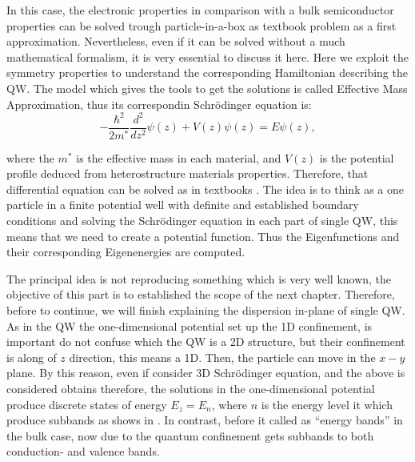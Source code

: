 In this case, the electronic properties in comparison with a bulk semiconductor properties can be solved trough particle-in-a-box as textbook problem as a first approximation. Nevertheless, even if it can be solved  without  a much mathematical formalism, it is very essential to discuss it here. 
Here we exploit the symmetry properties to understand the corresponding Hamiltonian describing the \gls{QW}.
The model which gives the tools to get the solutions is called  Effective Mass Approximation, thus its correspondin Schrödinger equation is\cite{harrison2016quantum,chuang1995physics,singh2003electronic,bastard1990wave,fox2002optical,davies1998physics}: 
\begin{equation}\label{eq:chapter-1-ema-schroedinger}
	-\dfrac{\hbar^{2}}{2m^{*}}\dfrac{d^{2}}{d {z}^{2}}\psi(z)+V(z)\psi(z)=E\psi(z),
\end{equation}

where the $m^{*}$ is the effective mass in each material, and $V(z)$ is the potential profile deduced from  heterostructure materials properties. Therefore, that differential equation can be solved as in textbooks \cite{de2014introduccion,griffiths2018introduction,sakurai1995modern,cohen2019quantum,chuang1995physics,harrison2016quantum,fox2002optical,bastard1990wave}. The idea is to think as a one particle in a finite potential well with definite and established  boundary conditions and solving the Schrödinger equation in each part of single \gls{QW}, this means that we need to create a potential function. Thus the Eigenfunctions and their corresponding Eigenenergies are computed.

The principal idea is not reproducing something which is very well known, the objective of this part is to established the scope of the next chapter. Therefore,  before to continue, we will finish explaining the dispersion in-plane of single \gls{QW}. As in the \gls{QW} the one-dimensional potential set up the 1D confinement, is important do not confuse which the \gls{QW} is a 2D structure, but their confinement is along of $z$ direction, this means a 1D. Then, the particle can move in the $x-y$ plane. By this reason, even if consider 3D Schrödinger equation, and  the above is considered obtains 
therefore, the solutions in the one-dimensional potential produce discrete states of energy $E_{z}=E_{n}$\cite{harrison2016quantum}, where $n$ is the energy level it which produce subbands as shows in . In contrast, before it called as ``energy bands'' in the bulk case, now due to the quantum confinement gets subbands to both conduction- and valence bands.

